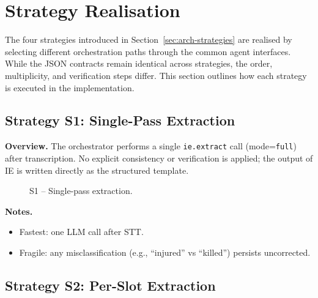 \section{Strategy Realisation}
\label{sec:impl-strategies}

The four strategies introduced in Section~\ref{sec:arch-strategies} are realised by selecting different orchestration paths through the common agent interfaces. While the JSON contracts remain identical across strategies, the order, multiplicity, and verification steps differ. This section outlines how each strategy is executed in the implementation.

\subsection*{Strategy S1: Single-Pass Extraction}

\textbf{Overview.}  
The orchestrator performs a single \texttt{ie.extract} call (mode=\texttt{full}) after transcription. No explicit consistency or verification is applied; the output of IE is written directly as the structured template.

\begin{figure}[H]
\centering
{}
\caption{S1 – Single-pass extraction.}
\end{figure}

\textbf{Notes.}  
\begin{itemize}
  \item Fastest: one LLM call after STT.  
  \item Fragile: any misclassification (e.g., “injured” vs “killed”) persists uncorrected.  
\end{itemize}

\subsection*{Strategy S2: Per-Slot Extraction}

